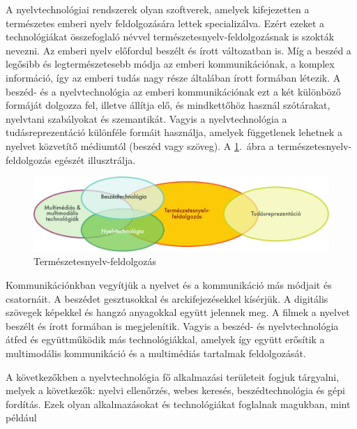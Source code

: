 
\begin{multicols}{2}

A nyelvtechnológiai rendszerek olyan szoft\-ve\-rek, amelyek kifejezetten a természetes emberi nyelv feldolgozására lettek specializálva. Ezért ezeket a technológiákat összefoglaló névvel természetesnyelv-fel\-dol\-go\-zás\-nak is szokták nevezni. Az emberi nyelv előfordul beszélt és írott változatban is. Míg a beszéd a legősibb és legtermészetesebb módja az emberi kommunikációnak, a komplex információ, így az emberi tudás nagy része általában írott formában létezik. A beszéd- és a nyelvtechnológia az emberi kommunikációnak ezt a két különböző formáját dolgozza fel, illetve állítja elő, és mindkettőhöz használ szótárakat, nyelvtani szabályokat és szemantikát. Vagyis a nyelvtechnológia a tudásreprezentáció különféle formáit használja, amelyek függetlenek lehetnek a nyelvet közvetítő médiumtól (beszéd vagy szöveg). A \ref{fig:ltincontext_de}.~ábra a természetesnyelv-feldolgozás egészét illusztrálja.

\begin{figure}[htb]
  \center
  \includegraphics[width=\textwidth]{../_media/hungarian/language_technologies}
  \caption{Természetesnyelv-feldolgozás}
  \label{fig:ltincontext_de}
\end{figure}

Kommunikációnkban ve\-gyít\-jük a nyelvet és a kommunikáció más módjait és csatornáit. A beszédet gesztusokkal és arckifejezésekkel kísérjük. A digitális szövegek képekkel és hangzó anyagokkal együtt jelennek meg. A filmek a nyelvet beszélt és írott formában is megjelenítik. Vagyis a beszéd- és nyelvtechnológia átfed és együttműködik más technológiákkal, amelyek így együtt erősítik a multimodális kommunikáció és a multimédiás tartalmak feldolgozását. 

A következőkben a nyelvtechnológia fő alkalmazási területeit fogjuk tárgyalni, melyek a következők: nyelvi ellenőrzés, webes keresés, beszédtechnológia és gépi fordítás. Ezek olyan alkalmazásokat és technológiákat foglalnak magukban, mint például


\end{multicols}
